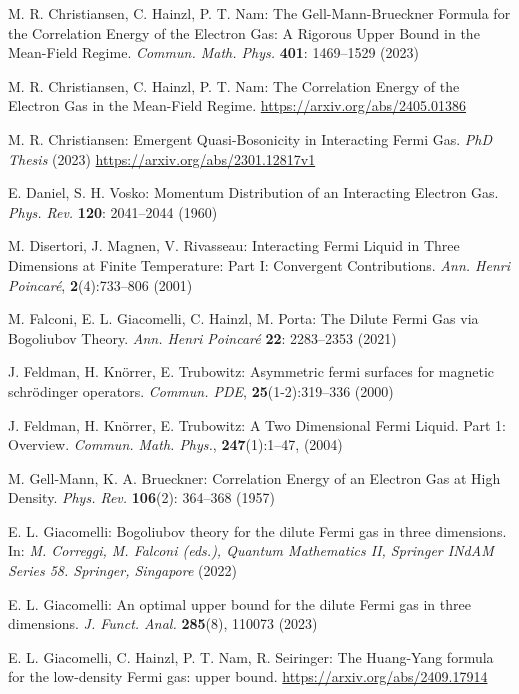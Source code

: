 \documentclass[12pt,a4paper]{article}
\numberwithin{equation}{section}
\newcommand{\1}{\mathbb{I}}
\theoremstyle{plain}
\theoremstyle{definition}
\theoremstyle{remark}
\theoremstyle{plain}
\theoremstyle{definition}
\theoremstyle{remark}
\begin{document}
\begin{thebibliography}{29}
M. R. Christiansen, C. Hainzl, P. T. Nam:
	The Gell-Mann-Brueckner Formula for the Correlation Energy of the Electron Gas: A Rigorous Upper Bound in the Mean-Field Regime.
	\emph{Commun. Math. Phys.} \textbf{401}: 1469--1529 (2023)

M. R. Christiansen, C. Hainzl, P. T. Nam:
	The Correlation Energy of the Electron Gas in the Mean-Field Regime.
	\url{https://arxiv.org/abs/2405.01386}

M. R. Christiansen:
	Emergent Quasi-Bosonicity in Interacting Fermi Gas.
	\emph{PhD Thesis} (2023)
	\url{https://arxiv.org/abs/2301.12817v1}

E. Daniel, S. H. Vosko:
	Momentum Distribution of an Interacting Electron Gas.
	\emph{Phys. Rev.} \textbf{120}: 2041--2044 (1960)

M. Disertori, J. Magnen, V. Rivasseau:
	Interacting {{Fermi Liquid}} in {{Three Dimensions}} at {{Finite
  Temperature}}: {{Part I}}: {{Convergent Contributions}}.
	\emph{Ann. Henri Poincar\'e}, \textbf{2}(4):733--806 (2001)

M. Falconi, E. L. Giacomelli, C. Hainzl, M. Porta:
	The Dilute Fermi Gas via Bogoliubov Theory.
	\emph{Ann. Henri Poincar\'e} \textbf{22}: 2283--2353 (2021)

J. Feldman, H. Kn{\"o}rrer, E. Trubowitz:
	Asymmetric fermi surfaces for magnetic schr\"odinger operators.
	\emph{Commun. PDE},
  \textbf{25}(1-2):319--336 (2000)

J. Feldman, H. Kn{\"o}rrer,  E. Trubowitz:
	A {{Two Dimensional Fermi Liquid}}. {{Part}} 1: {{Overview}}.
	\emph{Commun. Math. Phys.}, \textbf{247}(1):1--47, (2004)

M. Gell-Mann, K. A. Brueckner:
	Correlation Energy of an Electron Gas at High Density.
	\emph{Phys. Rev.} \textbf{106}(2): 364--368 (1957)

E. L. Giacomelli:
	Bogoliubov theory for the dilute Fermi gas in three dimensions.
	In: \emph{M. Correggi, M. Falconi (eds.), Quantum Mathematics II, Springer INdAM Series 58. Springer, Singapore} (2022)

E. L. Giacomelli:
	An optimal upper bound for the dilute Fermi gas in three dimensions.
	\emph{J. Funct. Anal.} \textbf{285}(8), 110073 (2023)

E. L. Giacomelli, C. Hainzl, P. T. Nam, R. Seiringer:
	The Huang-Yang formula for the low-density Fermi gas: upper bound.
	\url{https://arxiv.org/abs/2409.17914}


\end{thebibliography}
\end{document}
